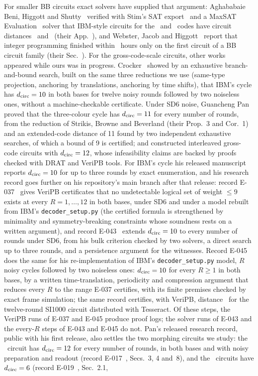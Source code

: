 \documentclass[aps,pra,twocolumn,superscriptaddress,nofootinbib,longbibliography,floatfix]{revtex4-2}
\newcommand{\dc}{d_{\mathrm{circ}}}
\begin{document}
For smaller BB circuits exact solvers have supplied that argument: Aghababaie Beni, Higgott and Shutty~\cite{beni2025tesseract} verified with Stim's SAT export~\cite{gidney2021stim} and a MaxSAT Evaluation \PriorMaxSatYear\ solver that IBM-style circuits for the \SmallCode\ and \PriorMidCode\ codes have circuit distances \PriorSmallD\ and \PriorMidD\ (their App.~\PriorTessApp), and Webster, Jacob and Higgott~\cite{webster2026distance} report that integer programming finished within \PriorMipHours\ hours only on the first circuit of a BB circuit family (their Sec.~\PriorWebsterSec). For the gross-code-scale circuits, other works appeared while ours was in progress. Crocker~\cite{crocker2026gross} showed by an exhaustive branch-and-bound search, built on the same three reductions we use (same-type projection, anchoring by translations, anchoring by time shifts), that IBM's cycle has $\dc=\IbmD$ in both bases for twelve noisy rounds followed by two noiseless ones, without a machine-checkable certificate. Under SD6 noise, Guancheng Pan~\cite{pan2026interleaving} proved that the three-colour cycle has $\dc=\TcD$ for every number of rounds, from the reduction of Strikis, Browne and Beverland (their Prop.~3 and Cor.~1) and an extended-code distance of 11 found by two independent exhaustive searches, of which a bound of 9 is certified; and constructed interleaved gross-code circuits with $\dc=\GrossD$, whose infeasibility claims are backed by proofs checked with DRAT and VeriPB tools. For IBM's cycle his released manuscript reports $\dc=\IbmD$ for up to three rounds by exact enumeration, and his research record goes further on his repository's main branch after that release: record E-037~\cite{pan2026e037} gives VeriPB certificates that no undetectable logical set of weight $\le 9$ exists at every $R=1,\dots,12$ in both bases, under SD6 and under a model rebuilt from IBM's \texttt{decoder\_setup.py} (the certified formula is strengthened by minimality and symmetry-breaking constraints whose soundness rests on a written argument), and record E-043~\cite{pan2026e043} extends $\dc=\IbmD$ to every number of rounds under SD6, from his bulk criterion checked by two solvers, a direct search up to three rounds, and a persistence argument for the witnesses. Record E-045~\cite{pan2026e045} does the same for his re-implementation of IBM's \texttt{decoder\_setup.py} model, $R$ noisy cycles followed by two noiseless ones: $\dc=\IbmD$ for every $R\ge1$ in both bases, by a written time-translation, periodicity and compression argument that reduces every $R$ to the range E-037 certifies, with its finite premises checked by exact frame simulation; the same record certifies, with VeriPB, distance \IbmD\ for the twelve-round SI1000 circuit distributed with Tesseract. Of these steps, the VeriPB runs of E-037 and E-045 produce proof logs; the solver runs of E-043 and the every-$R$ steps of E-043 and E-045 do not. Pan's released research record, public with his first release, also settles the two morphing circuits we study: the \GrossCode\ circuit has $\dc=\MorphBigD$ for every number of rounds, in both bases and with noisy preparation and readout (record E-017~\cite{pan2026e017}, Secs.~3, 4 and~8), and the \SmallCode\ circuits have $\dc=\MorphSmallD$ (record E-019~\cite{pan2026e019}, Sec.~2.1, 
\end{document}
